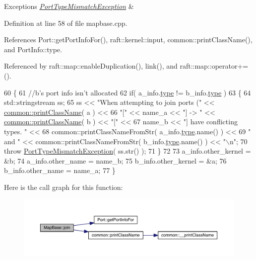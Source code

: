 \begin{DoxyExceptions}{Exceptions}
{\em \hyperlink{class_port_type_mismatch_exception}{Port\+Type\+Mismatch\+Exception}} & \\
\hline
\end{DoxyExceptions}


Definition at line 58 of file mapbase.\+cpp.



References Port\+::get\+Port\+Info\+For(), raft\+::kernel\+::input, common\+::print\+Class\+Name(), and Port\+Info\+::type.



Referenced by raft\+::map\+::enable\+Duplication(), link(), and raft\+::map\+::operator+=().


\begin{DoxyCode}
60 \{
61    \textcolor{comment}{//b's port info isn't allocated}
62    \textcolor{keywordflow}{if}( a\_info.\hyperlink{struct_port_info_a669818f0fde1da7b4a294c46e08d5980}{type} != b\_info.\hyperlink{struct_port_info_a669818f0fde1da7b4a294c46e08d5980}{type} )
63    \{
64       std::stringstream ss;
65       ss << \textcolor{stringliteral}{"When attempting to join ports ("} << \hyperlink{classcommon_aec4b942352abd180c71fca2c0dbd70b7}{common::printClassName}( a ) <<  
66          \textcolor{stringliteral}{"["} << name\_a << \textcolor{stringliteral}{"] -> "} << \hyperlink{classcommon_aec4b942352abd180c71fca2c0dbd70b7}{common::printClassName}( b ) << \textcolor{stringliteral}{"["} << 
67          name\_b << \textcolor{stringliteral}{"] have conflicting types.  "} << 
68             common::printClassNameFromStr( a\_info.\hyperlink{struct_port_info_a669818f0fde1da7b4a294c46e08d5980}{type}.name() ) <<  
69          \textcolor{stringliteral}{" and "} << common::printClassNameFromStr( b\_info.\hyperlink{struct_port_info_a669818f0fde1da7b4a294c46e08d5980}{type}.name() ) << \textcolor{stringliteral}{"\(\backslash\)n"}; 
70       \textcolor{keywordflow}{throw} \hyperlink{class_port_type_mismatch_exception}{PortTypeMismatchException}( ss.str() );
71    \}
72 
73    a\_info.other\_kernel = &b;
74    a\_info.other\_name   = name\_b;
75    b\_info.other\_kernel = &a;
76    b\_info.other\_name   = name\_a;
77 \}
\end{DoxyCode}
Here is the call graph for this function\+:
\nopagebreak
\begin{figure}[H]
\begin{center}
\leavevmode
\includegraphics[width=350pt]{class_map_base_a2624d7b81f0078dcc78e524045403e28_cgraph}
\end{center}
\end{figure}
\hypertarget{class_map_base_ad98ef02c1651130ad6b565ad156b97c1}{}\label{class_map_base_ad98ef02c1651130ad6b565ad156b97c1} 
